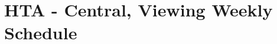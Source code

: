 \documentclass[10pt]{article}
\begin{document}
\section*{HTA - Central, Viewing Weekly Schedule}
\begin{center}
\end{center}
\end{document}
